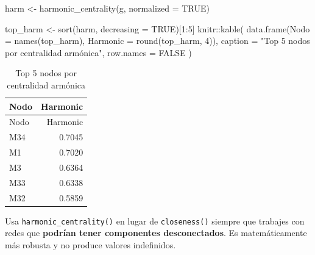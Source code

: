 \documentclass[
  letterpaper,
  DIV=11,
  numbers=noendperiod]{scrreprt}
\newenvironment{Shaded}{\begin{snugshade}}{\end{snugshade}}
\newcommand{\AttributeTok}[1]{\textcolor[rgb]{0.40,0.45,0.13}{#1}}
\newcommand{\ConstantTok}[1]{\textcolor[rgb]{0.56,0.35,0.01}{#1}}
\newcommand{\DecValTok}[1]{\textcolor[rgb]{0.68,0.00,0.00}{#1}}
\newcommand{\FunctionTok}[1]{\textcolor[rgb]{0.28,0.35,0.67}{#1}}
\newcommand{\NormalTok}[1]{\textcolor[rgb]{0.00,0.23,0.31}{#1}}
\newcommand{\OtherTok}[1]{\textcolor[rgb]{0.00,0.23,0.31}{#1}}
\newcommand{\SpecialCharTok}[1]{\textcolor[rgb]{0.37,0.37,0.37}{#1}}
\newcommand{\StringTok}[1]{\textcolor[rgb]{0.13,0.47,0.30}{#1}}
\begin{document}
\begin{Shaded}
\begin{Highlighting}[]
\NormalTok{harm }\OtherTok{\textless{}{-}} \FunctionTok{harmonic\_centrality}\NormalTok{(g, }\AttributeTok{normalized =} \ConstantTok{TRUE}\NormalTok{)}

\NormalTok{top\_harm }\OtherTok{\textless{}{-}} \FunctionTok{sort}\NormalTok{(harm, }\AttributeTok{decreasing =} \ConstantTok{TRUE}\NormalTok{)[}\DecValTok{1}\SpecialCharTok{:}\DecValTok{5}\NormalTok{]}
\NormalTok{knitr}\SpecialCharTok{::}\FunctionTok{kable}\NormalTok{(}
  \FunctionTok{data.frame}\NormalTok{(}\AttributeTok{Nodo =} \FunctionTok{names}\NormalTok{(top\_harm), }\AttributeTok{Harmonic =} \FunctionTok{round}\NormalTok{(top\_harm, }\DecValTok{4}\NormalTok{)),}
  \AttributeTok{caption =} \StringTok{"Top 5 nodos por centralidad armónica"}\NormalTok{,}
  \AttributeTok{row.names =} \ConstantTok{FALSE}
\NormalTok{)}
\end{Highlighting}
\end{Shaded}

\begin{longtable}[]{@{}lr@{}}
\caption{Top 5 nodos por centralidad armónica}\tabularnewline
\toprule\noalign{}
Nodo & Harmonic \\
\midrule\noalign{}
\endfirsthead
\toprule\noalign{}
Nodo & Harmonic \\
\midrule\noalign{}
\endhead
\bottomrule\noalign{}
\endlastfoot
M34 & 0.7045 \\
M1 & 0.7020 \\
M3 & 0.6364 \\
M33 & 0.6338 \\
M32 & 0.5859 \\
\end{longtable}

\begin{tcolorbox}[enhanced jigsaw, toprule=.15mm, colframe=quarto-callout-tip-color-frame, coltitle=black, titlerule=0mm, colback=white, breakable, leftrule=.75mm, arc=.35mm, bottomtitle=1mm, toptitle=1mm, rightrule=.15mm, bottomrule=.15mm, left=2mm, title=\textcolor{quarto-callout-tip-color}{\faLightbulb}\hspace{0.5em}{💡 Concepto clave}, colbacktitle=quarto-callout-tip-color!10!white, opacityback=0, opacitybacktitle=0.6]

Usa \texttt{harmonic\_centrality()} en lugar de \texttt{closeness()}
siempre que trabajes con redes que \textbf{podrían tener componentes
desconectados}. Es matemáticamente más robusta y no produce valores
indefinidos.

\end{tcolorbox}
\end{document}
